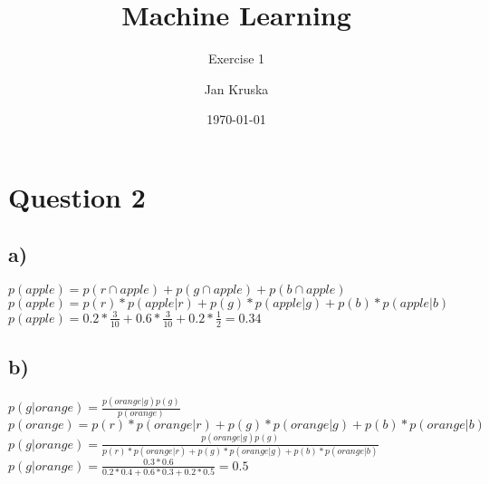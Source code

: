 \documentclass{scrartcl}
\begin{document}
	
	\title{Machine Learning}
	\subtitle{Exercise 1}
	\author{Jan Kruska}
	\date{\today}
	
	\maketitle
	
	\section*{Question 2}
	\subsection*{a)}
	$p(apple) = p(r\cap apple) + p(g\cap apple) + p(b\cap apple)$ \\
	$p(apple) = p(r) * p(apple|r) + p(g) * p(apple|g) + p(b) * p(apple|b)$ \\
	$p(apple) = 0.2 * \frac{3}{10} + 0.6 * \frac{3}{10} + 0.2 * \frac{1}{2} = 0.34 $
	
	\subsection*{b)}
	$p(g|orange) = \frac{p(orange|g)p(g)}{p(orange)}$ \\
	$p(orange) = p(r) * p(orange|r) + p(g) * p(orange|g) + p(b) * p(orange|b)$ \\
	$p(g|orange) = \frac{p(orange|g)p(g)}{p(r) * p(orange|r) + p(g) * p(orange|g) + p(b) * p(orange|b)}$ \\
	$p(g|orange) = \frac{0.3*0.6}{0.2*0.4 + 0.6*0.3 + 0.2*0.5} = 0.5$ \\
\end{document}
